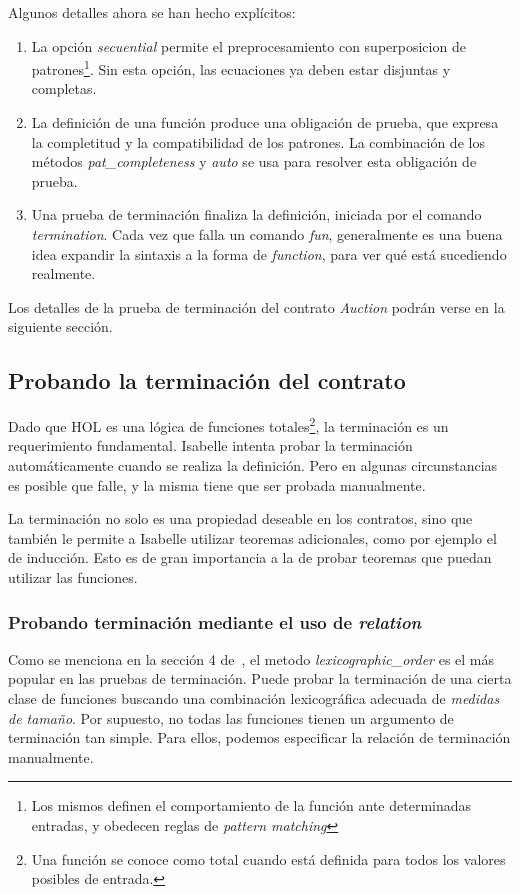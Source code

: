 \documentclass[12pt]{book}
\begin{document}
Algunos detalles ahora se han hecho explícitos:
\begin{enumerate}
    \item La opción \textit{secuential} permite el preprocesamiento con superposicion de patrones\footnote{Los mismos definen el comportamiento de la función ante determinadas entradas, y obedecen reglas de \textit{pattern matching}}. Sin esta opción, las ecuaciones ya deben estar disjuntas y completas.
    \item La definición de una función produce una obligación de prueba, que expresa la completitud y la compatibilidad de los patrones. La combinación de los métodos \textit{pat\_completeness} y \textit{auto} se usa para resolver esta obligación de prueba.
    \item Una prueba de terminación finaliza la definición, iniciada por el comando \textit{termination}. Cada vez que falla un comando \textit{fun}, generalmente es una buena idea expandir la sintaxis a la forma de \textit{function}, para ver qué está sucediendo realmente.
\end{enumerate}

Los detalles de la prueba de terminación del contrato \textit{Auction} podrán verse en la siguiente sección.


\subsection{Probando la terminación del contrato}

Dado que HOL es una lógica de funciones totales\footnote{Una función se conoce como total cuando está definida para todos los valores posibles de entrada.}, la terminación es un requerimiento fundamental. Isabelle intenta probar la terminación automáticamente cuando se realiza la definición. Pero en algunas circunstancias es posible que falle, y la misma tiene que ser probada manualmente.

La terminación no solo es una propiedad deseable en los contratos, sino que también le permite a Isabelle utilizar teoremas adicionales, como por ejemplo el de inducción. Esto es de gran importancia a la de probar teoremas que puedan utilizar las funciones.

\subsubsection{Probando terminación mediante el uso de \textit{relation}}

Como se menciona en la sección 4 de~\cite{termination-isabelle}, el metodo \textit{lexicographic\_order} es el más popular en las pruebas de terminación. Puede probar la terminación de una cierta clase de funciones buscando una combinación lexicográfica adecuada de \textit{medidas de tamaño}. Por supuesto, no todas las funciones tienen un argumento de terminación tan simple. Para ellos, podemos especificar la relación de terminación manualmente.
\end{document}
